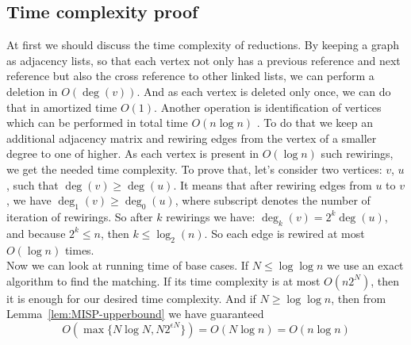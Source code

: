 \subsection{Time complexity proof}
At first we should discuss the time complexity of reductions. By keeping a graph
as adjacency lists, so that each vertex not only has a previous reference and
next reference but also the cross reference to other linked lists, we can
perform a deletion in $O(\deg(v))$. And as each vertex is deleted only once, we
can do that in amortized time $O(1)$. Another operation is identification of
vertices which can be performed in total time $O(n \log{n})$
\cite{chibaApplicationsLiptonTarjans1981}. To do that we keep an additional
adjacency matrix and rewiring edges from the vertex of a smaller degree to one
of higher. 
As each vertex is present in $O(\log{n})$ such rewirings, we get the
needed time complexity. To prove that, let's consider two vertices: $v$, $u$, 
such that $\deg(v) \geq \deg(u)$. It means that after rewiring edges from $u$ 
to $v$, we have $\deg_{1}(v) \geq \deg_{0}(u)$, where subscript denotes 
the number of iteration of rewirings. So after $k$ rewirings we have:
$\deg_k(v) = 2^k\deg(u)$, and because $2^k \leq n$, then $k \leq \log_2(n)$.
So each edge is rewired at most $O(\log{n})$ times.
\\
Now we can look at running time of base cases. If $N \leq \log\log n$ we use
an exact algorithm to find the matching. If its time complexity is at most
$O(n2^N)$, then it is enough for our desired time complexity. And if $N \geq
\log\log n$, then from Lemma~\ref{lem:MISP-upperbound} we have guaranteed
$$O(\max \{ N \log{N}, N 2^{ \epsilon N} \}) = O(N \log{n}) = O(n \log{n})$$

